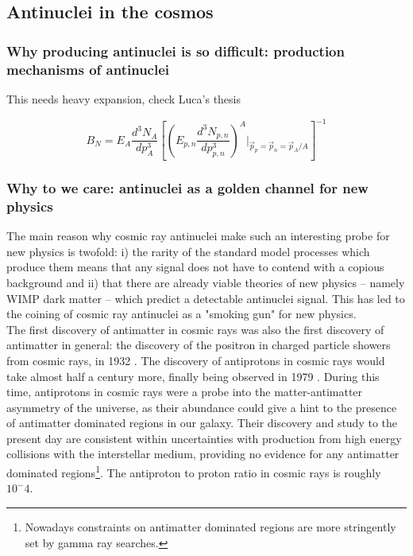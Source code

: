 %
%
\subsection{Antinuclei in the cosmos}

\subsubsection{ Why producing antinuclei is so difficult: production mechanisms of antinuclei}\label{sec:IntroProductionAntinuclei}
This needs heavy expansion, check Luca's thesis

\begin{equation}\label{eq:CoalescenceParameter}
    B_N = E_A \frac{d^3 N_A}{dp^3_A} \left[ \left( E_{p,n} \frac{d^3 N_{p,n}}{dp^3_{p,n}} \right)^A |_{\vec{p}_p=\vec{p}_n=\vec{p}_A/A } \right]^{-1}
\end{equation}
\subsubsection{ Why to we care: antinuclei as a golden channel for new physics}\label{sec:Intro:AntinucleiGoldenChannel}
The main reason why cosmic ray antinuclei make such an interesting probe for new physics is twofold: i) the rarity of the standard model processes which produce them means that any signal does not have to contend with a copious background and ii) that there are already viable theories of new physics -- namely WIMP dark matter -- which predict a detectable antinuclei signal. This has led to the coining of cosmic ray antinuclei as a "smoking gun" for new physics. \\

The first discovery of antimatter in cosmic rays was also the first discovery of antimatter in general: the discovery of the positron in charged particle showers from cosmic rays, in 1932 \cite{positron_discovery}. The discovery of antiprotons in cosmic rays would take almost half a century more, finally being observed in 1979 \cite{antiproton_CR_discovery, Bogomolov:1979hu}. During this time, antiprotons in cosmic rays were a probe into the matter-antimatter asymmetry of the universe, as their abundance could give a hint to the presence of antimatter dominated regions in our galaxy. Their discovery and study to the present day are consistent within uncertainties with production from high energy collisions with the interstellar medium, providing no evidence for any antimatter dominated regions\footnote{Nowadays constraints on antimatter dominated regions are more stringently set by gamma ray searches.}. The antiproton to proton ratio in cosmic rays is roughly $10^-{4}$. \\


